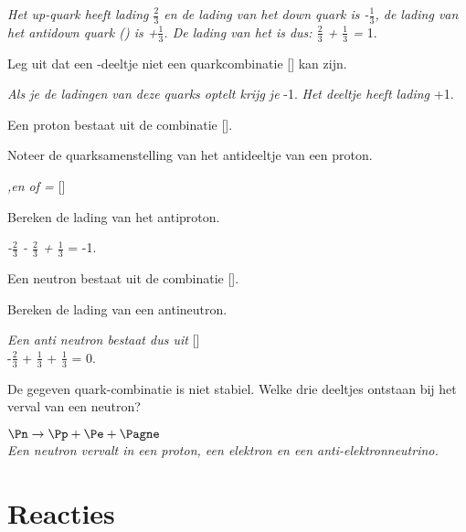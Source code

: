 \begin{opdrachten}
\begin{opdrachten}
    \textit{Het up-quark heeft lading $\frac{2}{3}$  en de lading van het down quark
    is -$\frac{1}{3}$, de lading van het antidown quark (\Paqd) is
    +$\frac{1}{3}$. De lading van het \Ppiplus is dus: $\frac{2}{3}$ +
    $\frac{1}{3}$ =} 1.

    \item Leg uit dat een \PSigmaplus-deeltje niet een quarkcombinatie [\Pstrange\Pdown\Pdown] 
    kan zijn.

    \textit{Als je de ladingen van deze quarks optelt krijg je} -1.
    \textit{ Het \PSigmaplus deeltje heeft lading} +1.
    \end{opdrachten}

\item Een proton bestaat uit de combinatie [\Pup\Pup\Pdown].
    \begin{opdrachten} 
    \item Noteer de quarksamenstelling van het antideeltje van een proton.

    \textit{\APup,\APup en \APdown of \Pap =} [\APup\APup\APdown]

    \item Bereken de lading van het antiproton.

    \textit{-$\frac{2}{3}$ - $\frac{2}{3}$ + $\frac{1}{3}$} = -1.
    \end{opdrachten}
     
\item Een neutron bestaat uit de combinatie [\Pup\Pdown\Pdown].
    \begin{opdrachten} 
    \item Bereken de lading van een antineutron.

    \textit{Een anti neutron bestaat dus uit }[\APup\APdown\APdown]\\
    -$\frac{2}{3}$ + $\frac{1}{3}$ + $\frac{1}{3}$ = 0.

    \item De gegeven quark-combinatie is niet stabiel.
    Welke drie deeltjes ontstaan bij het verval van een neutron?

    $\Pn \rightarrow \Pp + \Pe + \Pagne$ \\
    \textit{Een neutron vervalt in een proton, een elektron en een anti-elektronneutrino.}
    \end{opdrachten}

\section{Reacties}


\end{opdrachten}
